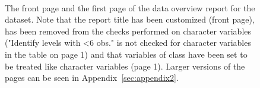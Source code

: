 \documentclass[article,shortnames]{jss}
\begin{document}
\begin{figure}[tb]
\begin{center}
\\
\end{center}
\caption{The front page and the first page of the data overview report for the  dataset. Note that the report title has been customized (front page),  has been removed from the checks performed on character variables ("Identify levels with <6 obs." is not checked for character variables in the table on page 1) and that variables of class  have been set to be treated like character variables (page 1). Larger versions of the pages can be seen in
  Appendix~\ref{sec:appendix2}.}
\label{fig:bigExampleP01}
\end{figure}
\end{document}
